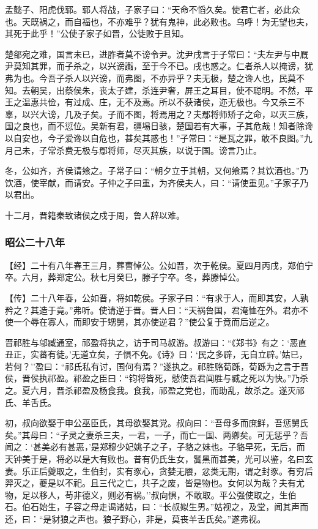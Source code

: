 \documentclass[]{article}
\begin{document}
孟懿子、阳虎伐郓。郓人将战，子家子曰：``天命不慆久矣。使君亡者，必此众也。天既祸之，而自福也，不亦难乎？犹有鬼神，此必败也。乌呼！为无望也夫，其死于此乎！''公使子家子如晋，公徒败于且知。

楚郤宛之难，国言未已，进胙者莫不谤令尹。沈尹戌言于子常曰：``夫左尹与中厩尹莫知其罪，而子杀之，以兴谤讟，至于今不已。戌也惑之。仁者杀人以掩谤，犹弗为也。今吾子杀人以兴谤，而弗图，不亦异乎？夫无极，楚之谗人也，民莫不知。去朝吴，出蔡侯朱，丧太子建，杀连尹奢，屏王之耳目，使不聪明。不然，平王之温惠共俭，有过成、庄，无不及焉。所以不获诸侯，迩无极也。今又杀三不辜，以兴大谤，几及子矣。子而不图，将焉用之？夫鄢将师矫子之命，以灭三族，国之良也，而不愆位。吴新有君，疆埸日骇，楚国若有大事，子其危哉！知者除谗以自安也，今子爱谗以自危也，甚矣其惑也！''子常曰：``是瓦之罪，敢不良图。''九月己未，子常杀费无极与鄢将师，尽灭其族，以说于国。谤言乃止。

冬，公如齐，齐侯请飨之。子常子曰：``朝夕立于其朝，又何飨焉？其饮酒也。''乃饮酒，使宰献，而请安。子仲之子曰重，为齐侯夫人，曰：``请使重见。''子家子乃以君出。

十二月，晋籍秦致诸侯之戍于周，鲁人辞以难。

\hypertarget{header-n2819}{%
\subsubsection{昭公二十八年}\label{header-n2819}}

【经】二十有八年春王三月，葬曹悼公。公如晋，次于乾侯。夏四月丙戌，郑伯宁卒。六月，葬郑定公。秋七月癸巳，滕子宁卒。冬，葬滕悼公。

【传】二十八年春，公如晋，将如乾侯。子家子曰：``有求于人，而即其安，人孰矜之？其造于竟。''弗听。使请逆于晋。晋人曰：``天祸鲁国，君淹恤在外。君亦不使一个辱在寡人，而即安于甥舅，其亦使逆君？''使公复于竟而后逆之。

晋祁胜与邬臧通室，祁盈将执之，访于司马叔游。叔游曰：``《郑书》有之：`恶直丑正，实蕃有徒。'无道立矣，子惧不免。《诗》曰：`民之多辟，无自立辟。'姑已，若何？''盈曰：``祁氏私有讨，国何有焉？''遂执之。祁胜赂荀跞，荀跞为之言于晋侯，晋侯执祁盈。祁盈之臣曰：``钧将皆死，憖使吾君闻胜与臧之死以为快。''乃杀之。夏六月，晋杀祁盈及杨食我。食我，祁盈之党也，而助乱，故杀之。遂灭祁氏、羊舌氏。

初，叔向欲娶于申公巫臣氏，其母欲娶其党。叔向曰：``吾母多而庶鲜，吾惩舅氏矣。''其母曰：``子灵之妻杀三夫，一君，一子，而亡一国、两卿矣。可无惩乎？吾闻之：`甚美必有甚恶，'是郑穆少妃姚子之子，子貉之妹也。子貉早死，无后，而天钟美于是，将必以是大有败也。昔有仍氏生女，鬒黑而甚美，光可以鉴，名曰玄妻。乐正后夔取之，生伯封，实有豕心，贪婪无餍，忿类无期，谓之封豕。有穷后羿灭之，夔是以不祀。且三代之亡，共子之废，皆是物也。女何以为哉？夫有尤物，足以移人，苟非德义，则必有祸。''叔向惧，不敢取。平公强使取之，生伯石。伯石始生，子容之母走谒诸姑，曰：``长叔姒生男。''姑视之，及堂，闻其声而还，曰：``是豺狼之声也。狼子野心，非是，莫丧羊舌氏矣。''遂弗视。
\end{document}
